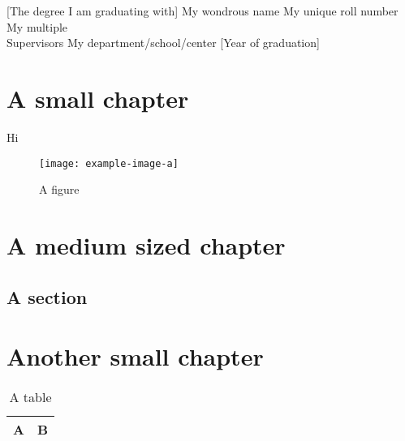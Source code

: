\documentclass[twoside]{iitbthesis}
\begin{document}
\frontmatter
\pagestyle{plain}
    [The degree I am graduating with]
    {My wondrous name}
    {My unique roll number}
    {My multiple\\Supervisors}
    {My department/school/center}
    [Year of graduation]
\Approval[4] %
    [2] %
\Declaration
{}
\tableofcontents
\listoffigures
\listoftables
\cleardoublepage
{}

\mainmatter
\pagestyle{headings}
\chapter{A small chapter}
Hi
\par \blindtext
\par \blindtext
\begin{figure}[htb]
    \centering
    \texttt{[image: example-image-a]}
    \caption{A figure}
\end{figure}

\chapter{A medium sized chapter}
\blindtext[10]
\section{A section}
\blindtext[10]

\chapter{Another small chapter}
\blindtext
\begin{table}
    \centering
    \caption{A table}
    \begin{tabular}{ll}
        \hline
        A & B\\
        \hline
    \end{tabular}
\end{table}

\backmatter
{}
\end{document}
